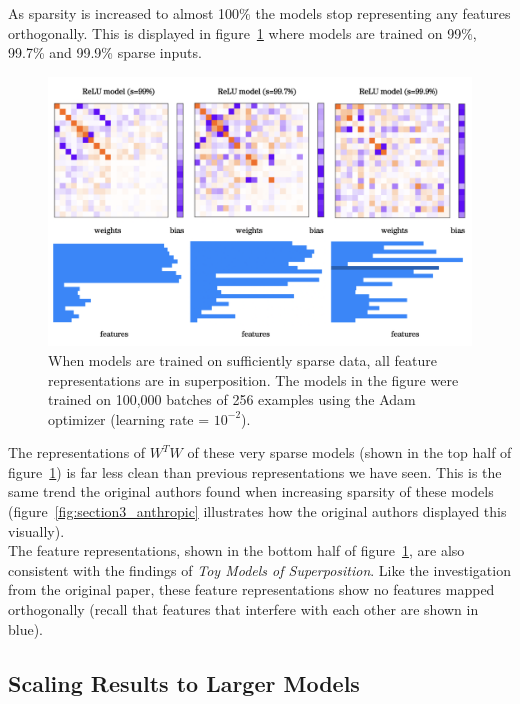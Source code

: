 \documentclass{article} %
\begin{document}
As sparsity is increased to almost 100\% the models stop representing any features
orthogonally. This is displayed in figure~\ref{fig:sparsity_2} where models are
trained on 99\%, 99.7\% and 99.9\% sparse inputs.

\begin{figure}[h]
    \centering
    \includegraphics[width=0.75\linewidth]{demonstrating_superposition/images/sparsity_superposition2.png}
    \captionsetup{font=footnotesize, width=0.7\linewidth} %
    \caption{
        When models are trained on sufficiently sparse data, all feature
        representations are in superposition. The models in the figure were
        trained on 100,000 batches of 256 examples using the Adam optimizer 
        (learning rate = $10^{-2}$).
    }
    \label{fig:sparsity_2}
\end{figure}

The representations of $W^{T}W$ of these very sparse models (shown in the top
half of figure~\ref{fig:sparsity_2}) is far less clean than previous
representations we have seen. This is the same trend the original authors
found when increasing sparsity of these models (figure~\ref{fig:section3_anthropic}
illustrates how the original authors displayed this visually). \\

The feature representations, shown in the bottom half of figure~\ref{fig:sparsity_2},
are also consistent with the findings of \textit{Toy Models of Superposition}.
Like the investigation from the original paper, these feature representations 
show no features mapped orthogonally (recall that features that interfere with
each other are shown in blue). \\

\subsection{Scaling Results to Larger Models}
\end{document}
